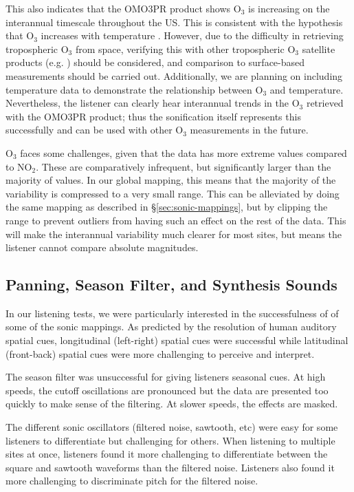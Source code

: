 \documentclass[a4paper,10pt,oneside]{article}
\newcommand{\ce}[1]{$\mathrm{#1}$}
\begin{document}
\begin{sloppy}
This also indicates that the OMO3PR product shows \ce{O_3} is increasing on the interannual timescale throughout the US. This is consistent with the hypothesis that \ce{O_3} increases with temperature \cite{lin17}. However, due to the difficulty in retrieving tropospheric \ce{O_3} from space, verifying this with other tropospheric \ce{O_3} satellite products (e.g. \cite{choi08}) should be considered, and comparison to surface-based measurements should be carried out. Additionally, we are planning on including temperature data to demonstrate the relationship between \ce{O_3} and temperature.  Nevertheless, the listener can clearly hear interannual trends in the \ce{O_3} retrieved with the OMO3PR product; thus the sonification itself represents this successfully and can be used with other \ce{O_3} measurements in the future.

\ce{O_3} faces some challenges, given that the data has more extreme values compared to \ce{NO_2}. These are comparatively infrequent, but significantly larger than the majority of values.  In our global mapping, this means that the majority of the variability is compressed to a very small range. This can be alleviated by doing the same mapping as described in \S\ref{sec:sonic-mappings}, but by clipping the range to prevent outliers from having such an effect on the rest of the data.  This will make the interannual variability much clearer for most sites, but means the listener cannot compare absolute magnitudes. 

\subsection{Panning, Season Filter, and Synthesis Sounds}
In our listening tests, we were particularly interested in the successfulness of of some of the sonic mappings. As predicted by the resolution of human auditory spatial cues, longitudinal (left-right) spatial cues were successful while latitudinal (front-back) spatial cues were more challenging to perceive and interpret. 

The season filter was unsuccessful for giving listeners seasonal cues. At high speeds, the cutoff oscillations are pronounced but the data are presented too quickly to make sense of the filtering. At slower speeds, the effects are masked.  

The different sonic oscillators (filtered noise, sawtooth, etc) were easy for some listeners to differentiate but challenging for others.  When listening to multiple sites at once, listeners found it more challenging to differentiate between the square and sawtooth waveforms than the filtered noise. Listeners also found it more challenging to discriminate pitch for the filtered noise.   


\end{sloppy}
\end{document}
